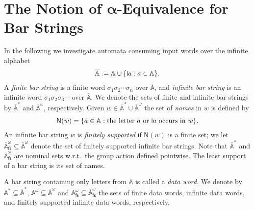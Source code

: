 \documentclass[10pt,a4paper]{amsart}
\newcommand{\midmid}{\hspace{0.2ex}{\rule[-0.1ex]{0.6pt}{1.65ex}}\hspace{0.2ex}}
\newcommand{\compr}{:}
\newcommand{\newletter}[1]{{\midmid}#1}
\newcommand{\Names}[1]{\mathsf{N}(#1)}
\newcommand{\barA}{\overline{\names}}
\numberwithin{equation}{section}
\newcommand{\seq}{\subseteq}
\newcommand{\muBar}{\textsf{Bar-$\mu$TL}}
\newcommand{\pow}{\mathcal{P}}
\newcommand{\fs}{\mathsf{fs}}
\newcommand{\+}[1]{\mathcal{#1}\xspace}
\DeclareMathOperator{\LFP}{\mathsf{LFP}}
\DeclareMathOperator{\GFP}{\mathsf{GFP}}
\newcommand{\names}{\mathbb{A}}
\newcommand{\powfs}{\pow_{\fs}}
\theoremstyle{definition}
\begin{document}



\section{The Notion of $\boldsymbol{\alpha}$-Equivalence for Bar Strings}\label{sec:alpha-equiv}
In the following we investigate automata consuming input words over the infinite alphabet 
\[
  \barA := \names \cup \{\newletter a: a\in \names\}.
\]
A \emph{finite bar string} is a finite word $\sigma_1\sigma_2\cdots \sigma_n$ over $\barA$, and \emph{infinite bar string} is an infinite word $\sigma_1\sigma_2 \sigma_3\cdots$ over $\barA$. We denote the sets of finite and infinite bar strings by  $\barA^*$ and $\barA^\omega$, respectively. Given $w\in \barA^*\cup \barA^\omega$ the set of \emph{names} in $w$ is defined by 
\[ \Names{w} = \{ a\in \names \compr \text{the letter $a$ or $\newletter a$ occurs in $w$} \}. \]
An infinite bar string $w$ is \emph{finitely supported} if $\Names{w}$ is a finite set; we let $\barA^\omega_\fs\seq \barA^\omega$ denote the set of finitely supported infinite bar strings. Note that $\barA^*$ and $\barA^\omega_\fs$ are nominal sets w.r.t.\ the group action defined pointwise. The least support of a bar string is its set of names.

A bar string containing only letters from $\names$ is called a \emph{data word}. We denote by $\names^*\seq \barA^*$, $\names^\omega\seq \barA^\omega$ and $\names^\omega_\fs\seq \barA^\omega_\fs$ the sets of finite data words, infinite data words, and finitely supported infinite data words, respectively. 
\end{document}
